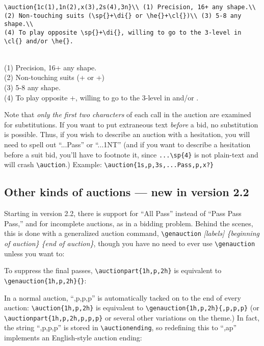 \documentclass[10pt]{article}%
\newcommand{\gap}{\vspace{\baselineskip}}
\begin{document}
\begin{verbatim}
\auction{1c(1),1n(2),x(3),2s(4),3n}\\ (1) Precision, 16+ any shape.\\ 
(2) Non-touching suits (\sp{}+\di{} or \he{}+\cl{})\\ (3) 5-8 any shape.\\ 
(4) To play opposite \sp{}+\di{}, willing to go to the 3-level in \cl{} and/or \he{}.
\end{verbatim}

\\
(1) Precision, 16+ any shape.\\
(2) Non-touching suits (\sp{}+\di{} or \he{}+\cl{})\\
(3) 5-8 any shape.\\ (4) To play opposite \sp{}+\di{}, 
willing to go to the 3-level in \cl{} and/or \he{}.

\gap
Note that \textit{only the first two characters} of each call in the auction are examined for substitutions. If you want to put extraneous text \textit{before} a bid, no substitution is possible. Thus, if you wish to describe an auction with a hesitation, you will need to spell out ``...Pass'' or ``...1NT'' (and if you want to describe a hesitation before a suit bid, you'll have to footnote it, since \verb+...\sp{4}+ is not plain-text and will crash \verb+\auction+.) Example: \verb+\auction{1s,p,3s,...Pass,p,x?}+

\gap{}\gap

\subsection*{Other kinds of auctions --- new in version 2.2}

Starting in version 2.2, there is support for ``All Pass'' instead of ``Pass Pass Pass,'' and for incomplete auctions, as in a bidding problem. Behind the scenes, this is done with a generalized auction command, \verb+\genauction+ \textit{[labels] \{beginning of auction\} \{end of auction\}}, though you have no need to ever use \verb+\genauction+ unless you want to:

To suppress the final passes,  \verb+\auctionpart{1h,p,2h}+ is equivalent to \verb+\genauction{1h,p,2h}{}+:


\noindent In a normal auction, ``,p,p,p'' is automatically tacked on to the end of every auction: \verb+\auction{1h,p,2h}+ is equivalent to \verb+\genauction{1h,p,2h}{,p,p,p}+ (or  \verb+\auctionpart{1h,p,2h,p,p,p}+ or several other variations on the theme.) In fact, the string ``,p,p,p'' is stored in \verb+\auctionending+, so redefining this to ``,ap'' implements an English-style auction ending:
\end{document}
